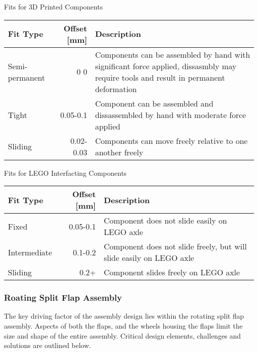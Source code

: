 \documentclass[11pt]{article}
\begin{document}
Fits for 3D Printed Components
\begin{center}
\begin{tabular}{lrl}
Fit Type & Offset [mm] & Description\\
\hline
Semi-permanent & 0 0 & Components can be assembled by hand with significant force applied, dissasmbly may require tools and result in permanent deformation\\
Tight & 0.05-0.1 & Component can be assembled and dissassembled by hand with moderate force applied\\
Sliding & 0.02-0.03 & Components can move freely relative to one another  freely\\
\end{tabular}
\end{center}

Fits for LEGO Interfacting Components
\begin{center}
\begin{tabular}{lrl}
Fit Type & Offset [mm] & Description\\
\hline
Fixed & 0.05-0.1 & Component does not slide easily on LEGO axle\\
Intermediate & 0.1-0.2 & Component does not slide freely, but will slide easily on LEGO axle\\
Sliding & 0.2+ & Component slides freely on LEGO axle\\
\end{tabular}
\end{center}


\subsubsection{Roating Split Flap Assembly}
\label{sec:org8609d8a}
The key driving factor of the assembly design lies within the rotating split flap assembly. Aspects of both the flaps, and the wheels housing the flaps limit the size and shape of the entire assembly. Critical design elements, challenges and solutions are outlined below.
\end{document}
